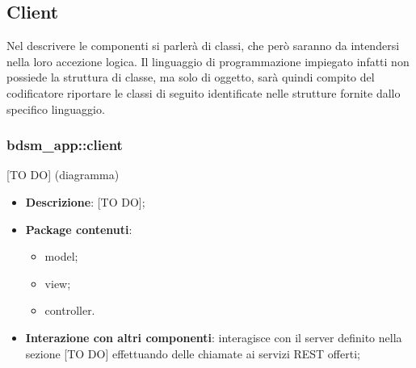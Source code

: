 %


\subsection{Client} %
\label{sub:client}
Nel descrivere le componenti si parlerà di classi, che però saranno da intendersi nella loro accezione logica. Il linguaggio di programmazione impiegato infatti non possiede la struttura di classe, ma solo di oggetto, sarà quindi compito del codificatore riportare le classi di seguito identificate nelle strutture fornite dallo specifico linguaggio.

	\subsubsection{bdsm\_app::client} %
	\label{ssub:bdsm_app_client}
	[TO DO] (diagramma) \newline \newline
	
	\begin{itemize}
		\item \textbf{Descrizione}: [TO DO];
		\item \textbf{Package contenuti}:
			\begin{itemize}
				\item model;
				\item view;
				\item controller.
			\end{itemize}
		\item \textbf{Interazione con altri componenti}: interagisce con il server definito nella sezione [TO DO] effettuando delle chiamate ai servizi REST offerti;
	\end{itemize}

